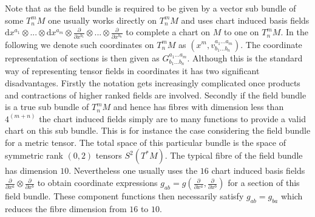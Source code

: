 \documentclass[a4paper,12pt, DIV=14, BCOR=5mm, twoside, headsepline]{scrbook}
\begin{document}
Note that as the field bundle is required to be given by a vector sub bundle of some $T^m_n M$ one usually works directly on $T^m_n M$ and uses chart induced basis fields $\mathrm{d}x^{a_1}\otimes ... \otimes \mathrm{d}x^{a_m} \otimes \frac{\partial}{\partial x^{b_1}} \otimes ... \otimes \frac{\partial}{\partial x^{b_n}}$ to complete a chart on $M$ to one on $T ^m _ n M$. In the following we denote such coordinates on $T^m_n M$ as $(x^m, v^{a_1 ... a_m}_{b_1 ... b_n})$. The coordinate representation of sections is then given as $G^{a_1 ... a_m}_{b_1 ... b_n}$. Although this is the standard way of representing tensor fields in coordinates it has two significant disadvantages. Firstly the notation gets increasingly complicated once products and contractions of higher ranked fields are involved. Secondly if the field bundle is a true sub bundle of $T^m_nM$ and hence has fibres with dimension less than $4^{(m+n)}$ the chart induced fields simply are to many functions to provide a valid chart on this sub bundle. This is for instance the case considering the field bundle for a metric tensor. The total space of this particular bundle is the space of symmetric rank $(0,2)$ tensors $S^2(T^{\ast}M)$. The typical fibre of the field bundle has dimension $10$. Nevertheless one usually uses the $16$ chart induced basis fields $ \frac{\partial}{\partial x^a}  \otimes \frac{\partial}{\partial x^b}$ to obtain coordinate expressions $g_{ab} = g(\frac{\partial}{\partial x^a},\frac{\partial}{\partial x^b})$ for a section of this field bundle. These component functions then necessarily satisfy $g_{ab} = g_{ba}$ which reduces the fibre dimension from $16$ to $10$. \\
\end{document}
